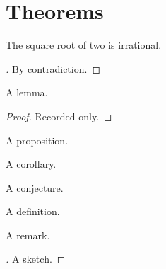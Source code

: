 \flmHeading[toc=true]
\section{Theorems}{\flmLabels{}}

\begin{theorem}[My Theorem]\flmLabels{\label{ref1}}
The square root of two is irrational.
\end{theorem}

\begin{proof}[{}]
By contradiction.
\end{proof}

\begin{lemma}\flmLabels{\label{ref2}}
A lemma.
\end{lemma}

\begin{proof}
Recorded only.
\end{proof}

\begin{proposition}\noproofref A proposition.
\end{proposition}

\begin{corollary}\flmLabels{\label{ref3}}\noproofref A corollary.
\end{corollary}

\begin{conjecture}
A conjecture.
\end{conjecture}

\begin{definition}\flmLabels{\label{ref4}}
A definition.
\end{definition}

\begin{remark}
A remark.
\end{remark}

\begin{proof}[{}]
A sketch.
\end{proof}

